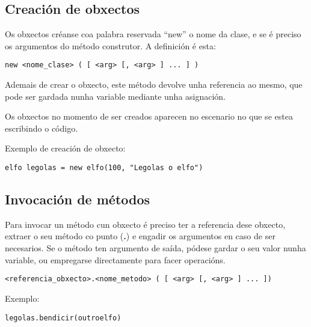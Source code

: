 \subsection{Creación de obxectos}
Os obxectos créanse coa palabra reservada ``new'' o nome da clase, e se é
preciso os argumentos do método construtor. A definición é esta:
\begin{lstlisting}
new <nome_clase> ( [ <arg> [, <arg> ] ... ] )
\end{lstlisting} 
\par Ademais de crear o obxecto, este método devolve unha referencia ao mesmo,
que pode ser gardada nunha variable mediante unha asignación.
\par
Os obxectos no momento de ser creados aparecen no escenario no que se
estea escribindo o código.
\par Exemplo de creación de obxecto:
\begin{lstlisting}
elfo legolas = new elfo(100, "Legolas o elfo")
\end{lstlisting}

\subsection{Invocación de métodos}
Para invocar un método cun obxecto é preciso ter a referencia dese obxecto,
extraer o seu método co punto ({\bf .}) e engadir os argumentos en caso de ser
necesarios. Se o método ten argumento de saída, pódese gardar o seu valor nunha
variable, ou empregarse directamente para facer operacións.
\begin{lstlisting}
<referencia_obxecto>.<nome_metodo> ( [ <arg> [, <arg> ] ... ])
\end{lstlisting} 
\par Exemplo:
\begin{lstlisting}
legolas.bendicir(outroelfo)
\end{lstlisting}

